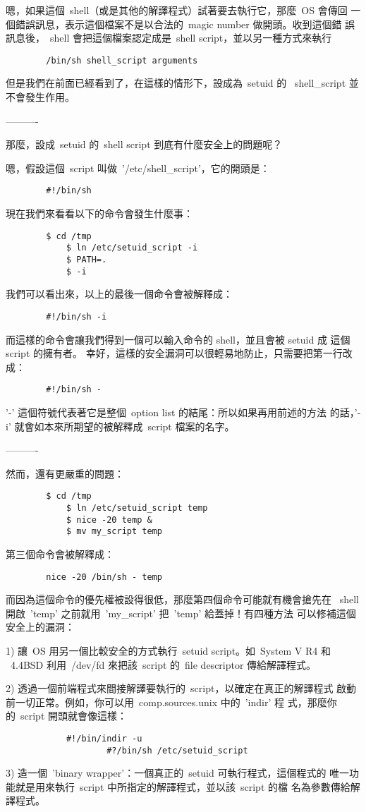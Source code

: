 \documentclass{article}
\begin{document}
\begin{CJK*}{Bg5}{ming}
	嗯，如果這個~shell（或是其他的解譯程式）試著要去執行它，那麼~OS 會傳回
	一個錯誤訊息，表示這個檔案不是以合法的~magic number 做開頭。收到這個錯
	誤訊息後，~shell 會把這個檔案認定成是~shell script，並以另一種方式來執行
\begin{verbatim}
		/bin/sh shell_script arguments
\end{verbatim}
	但是我們在前面已經看到了，在這樣的情形下，設成為~setuid 的 
        ~shell\_script 並不會發生作用。

        ----------

	那麼，設成~setuid 的~shell script 到底有什麼安全上的問題呢？

	嗯，假設這個~script 叫做~'/etc/shell\_script'，它的開頭是：
\begin{verbatim}
		#!/bin/sh
\end{verbatim}
	現在我們來看看以下的命令會發生什麼事：
\begin{verbatim}
		$ cd /tmp
	        $ ln /etc/setuid_script -i
        	$ PATH=.
	        $ -i
\end{verbatim}
	我們可以看出來，以上的最後一個命令會被解釋成：
\begin{verbatim}
		#!/bin/sh -i
\end{verbatim}
	而這樣的命令會讓我們得到一個可以輸入命令的 shell，並且會被 setuid 成
        這個  script 的擁有者。
	幸好，這樣的安全漏洞可以很輕易地防止，只需要把第一行改成：
\begin{verbatim}
		#!/bin/sh -
\end{verbatim}
	'-' 這個符號代表著它是整個~option list 的結尾：所以如果再用前述的方法
        的話，'-i' 就會如本來所期望的被解釋成~script 檔案的名字。

        ----------

	然而，還有更嚴重的問題：
\begin{verbatim}
		$ cd /tmp
	        $ ln /etc/setuid_script temp
        	$ nice -20 temp &
	        $ mv my_script temp
\end{verbatim}
	第三個命令會被解釋成：
\begin{verbatim}
		nice -20 /bin/sh - temp
\end{verbatim}
	而因為這個命令的優先權被設得很低，那麼第四個命令可能就有機會搶先在 
	~shell 開啟~'temp' 之前就用~'my\_script' 把~'temp' 給蓋掉！有四種方法
        可以修補這個安全上的漏洞：

	1)  讓~OS 用另一個比較安全的方式執行~setuid script。如~System V R4 和 
	   ~4.4BSD 利用~/dev/fd 來把該~script 的~file descriptor 傳給解譯程式。

	2)  透過一個前端程式來間接解譯要執行的~script，以確定在真正的解譯程式
            啟動前一切正常。例如，你可以用~comp.sources.unix 中的~'indir' 程
            式，那麼你的~script 開頭就會像這樣：
\begin{verbatim}
			#!/bin/indir -u
	                #?/bin/sh /etc/setuid_script
\end{verbatim}
	3)  造一個~'binary wrapper'：一個真正的~setuid 可執行程式，這個程式的
            唯一功能就是用來執行~script 中所指定的解譯程式，並以該~script 的檔
            名為參數傳給解譯程式。


\end{CJK*}
\end{document}
